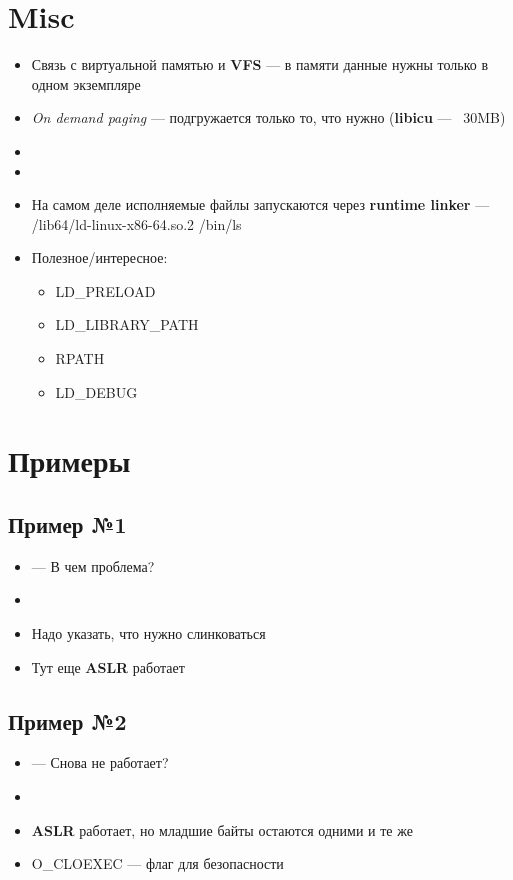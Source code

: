 \documentclass[../../lectures.tex]{subfiles}
\begin{document}
\section{Misc}
\begin{itemize}
    \item Связь с виртуальной памятью и \textbf{VFS} --- в памяти данные нужны только в одном экземпляре
    \item \emph{On demand paging} --- подгружается только то, что нужно (\textbf{libicu} --- ~30MB)
    \item {}
    \item {}
    \item На самом деле исполняемые файлы запускаются через \textbf{runtime linker} --- /lib64/ld-linux-x86-64.so.2 /bin/ls
    \item Полезное/интересное:
        \begin{itemize}
            \item LD\_PRELOAD
            \item LD\_LIBRARY\_PATH
            \item RPATH
            \item LD\_DEBUG
        \end{itemize}
\end{itemize}

\section{Примеры}
\subsection{Пример №1}
\begin{itemize}
    \item {} --- В чем проблема?
    \item {}\\
    \item Надо указать, что нужно слинковаться
    \item Тут еще \textbf{ASLR} работает
\end{itemize}

\subsection{Пример №2}
\begin{itemize}
    \item {} --- Снова не работает?
    \item {}
    \item \textbf{ASLR} работает, но младшие байты остаются одними и те же
    \item O\_CLOEXEC --- флаг для безопасности
\end{itemize}
\end{document}
